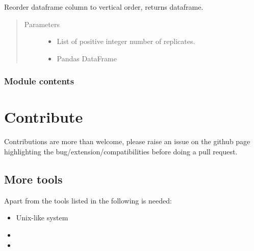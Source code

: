 \documentclass[letterpaper,10pt,english]{sphinxmanual}
\begin{document}
\begin{fulllineitems}
\label{\detokenize{platelib:platelib.plateread.vert_order}}
Reorder dataframe column to vertical order, returns dataframe.
\begin{quote}\begin{description}
\item[{Parameters}] \leavevmode\begin{itemize}
\item {} 
 \textendash{} List of positive integer number of replicates.

\item {} 
 \textendash{} Pandas DataFrame

\end{itemize}

\end{description}\end{quote}

\end{fulllineitems}



\subsection{Module contents}
\label{\detokenize{platelib:module-contents}}\label{\detokenize{platelib:module-platelib}}

\chapter{Contribute}
\label{\detokenize{contribute:contribute}}\label{\detokenize{contribute::doc}}
Contributions are more than welcome, please raise an issue on the github page
highlighting the bug/extension/compatibilities before doing a pull request.


\section{More tools}
\label{\detokenize{contribute:more-tools}}
Apart from the tools listed in {\hyperref[\detokenize{install:installation}]{}} the following is needed:
\begin{itemize}
\item {} 
Unix-like system

\item {} 

\item {} 

\end{itemize}
\end{document}
